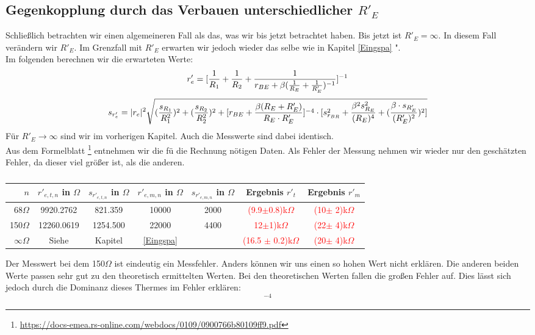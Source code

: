 \subsection{Gegenkopplung durch das Verbauen unterschiedlicher $R'_E$}

Schließlich betrachten wir einen algemeineren Fall als das, was wir bis jetzt betrachtet haben. 
Bis jetzt ist $R'_E = \infty$. In diesem Fall verändern wir $R'_E$. Im Grenzfall mit $R'_E$ erwarten wir 
jedoch wieder das selbe wie in Kapitel \glqq \ref{Eingspa}  ".\\
Im folgenden berechnen wir die erwarteten Werte:\\
\begin{equation*}
    \centering
    r'_e = [\frac{1}{R_1}+\frac{1}{R_2}+\frac{1}{r_{BE}+\beta(\frac{1}{R_E}+\frac{1}{R'_{E}})^{-1}}]^{-1}
\end{equation*}
\begin{equation*}
    \centering
    s_{r'_e} = |r_e|^2 \sqrt{(\frac{s_{R_1}}{R_1^2})^2+(\frac{s_{R_2}}{R_2^2})^2+[r_{BE}+\frac{\beta(R_E+R'_E)}{R_E \cdot R'_E}]^{-4} \cdot [s_{r_{BR}}^2+\frac{\beta^2 s_{R_E}^2}{(R_{E})^4}+(\frac{\beta \cdot s_{R'_E}}{(R'_{E})^2})^2]}
\end{equation*}
Für $R'_E \to \infty$ sind wir im vorherigen Kapitel. Auch die Messwerte sind dabei identisch.\\
Aus dem Formelblatt \footnote{\url{https://docs-emea.rs-online.com/webdocs/0109/0900766b80109ff9.pdf}} entnehmen wir die fü die Rechnung nötigen Daten.
Als Fehler der Messung nehmen wir wieder nur den geschätzten Fehler, da dieser viel größer ist, als die anderen.
\begin{table}[h]
    \centering
    \begin{tabular}{r|c|c|c|c||c||c}
         $n$& $r'_{e,t,n}$ in $\Omega $ & $s_{r'_{e,t,n}}$ in $\Omega $ & $r'_{e,m,n}$ in $\Omega$ & $s_{r'_{e,m,n}}$ in $\Omega $& Ergebnis $r'_t$ & Ergebnis $r'_m$\\
        \hline
        68$\Omega$ & 9920.2762 & 821.359 & 10000 & 2000& \textcolor{red}{(9.9$\pm$0.8)k$\Omega$}& \textcolor{red}{(10$\pm $ 2)k$\Omega$}  \\
        150$\Omega$ &12260.0619 & 1254.500  &22000 & 4400& \textcolor{red}{12$\pm$1)k$\Omega$}& \textcolor{red}{(22$\pm $ 4)k$\Omega$}  \\
        $\infty\Omega$& Siehe & Kapitel& \ref{Eingspa} &  & \textcolor{red}{(16.5 $\pm$ 0.2)k$\Omega$}& \textcolor{red}{(20$\pm $ 4)k$\Omega$}  \\
    \end{tabular}
    \caption{}
\end{table}
Der Messwert bei dem 150$\Omega$ ist eindeutig ein Messfehler. Anders können wir uns einen so hohen Wert nicht erklären. Die anderen beiden Werte passen sehr gut 
zu den theoretisch ermittelten Werten. Bei den theoretischen Werten fallen die großen Fehler auf. Dies lässt sich jedoch durch die Dominanz dieses Thermes im Fehler erklären:
\begin{equation*}
    [r_{BE}+\frac{\beta(R_E+R'_E)}{R_E \cdot R'_E}]^{-4}
\end{equation*}

